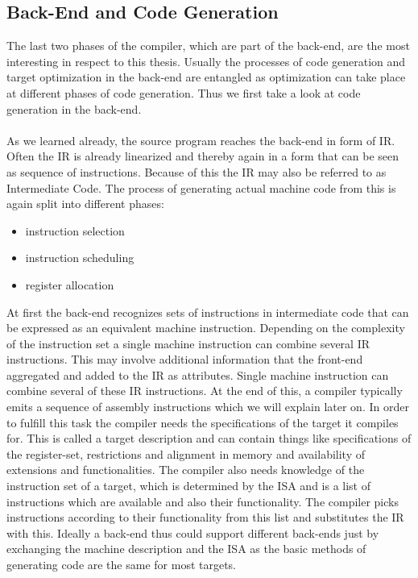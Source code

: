 {\subsection{Back-End and Code Generation}
The last two phases of the compiler, which are part of the back-end, are the most interesting in respect to this thesis.
Usually the processes of code generation and target optimization in the back-end are entangled as optimization can take place at different phases of code generation.
Thus we first take a look at code generation in the back-end.
\\
\\
As we learned already, the source program reaches the back-end in form of \ac{IR}.
Often the \ac{IR} is already linearized and thereby again in a form that can be seen as sequence of instructions.
Because of this the \ac{IR} may also be referred to as Intermediate Code.
The process of generating actual machine code from this is again split into different phases:
\begin{itemize}
    \item instruction selection
    \item instruction scheduling
    \item register allocation
\end{itemize}

At first the back-end recognizes sets of instructions in intermediate code that can be expressed as an equivalent machine instruction.
Depending on the complexity of the instruction set a single machine instruction can combine several \ac{IR} instructions.
This may involve additional information that the front-end aggregated and added to the \ac{IR} as attributes.
Single machine instruction can combine several of these \ac{IR} instructions.
At the end of this, a compiler typically emits a sequence of assembly instructions which we will explain later on.
In order to fulfill this task the compiler needs the specifications of the target it compiles for.
This is called a target description and can contain things like specifications of the register-set, restrictions and alignment in memory and availability of extensions and functionalities.
The compiler also needs knowledge of the instruction set of a target, which is determined by the \ac{ISA} and is a list of instructions which are available and also their functionality.
The compiler picks instructions according to their functionality from this list and substitutes the \ac{IR} with this.
Ideally a back-end thus could support different back-ends just by exchanging the machine description and the \ac{ISA} as the basic methods of generating code are the same for most targets.

}
